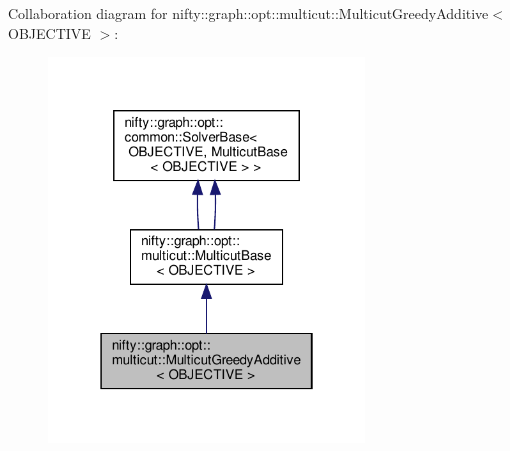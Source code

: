 Collaboration diagram for nifty\+:\+:graph\+:\+:opt\+:\+:multicut\+:\+:Multicut\+Greedy\+Additive$<$ O\+B\+J\+E\+C\+T\+I\+VE $>$\+:
\nopagebreak
\begin{figure}[H]
\begin{center}
\leavevmode
\includegraphics[width=238pt]{classnifty_1_1graph_1_1opt_1_1multicut_1_1MulticutGreedyAdditive__coll__graph}
\end{center}
\end{figure}
